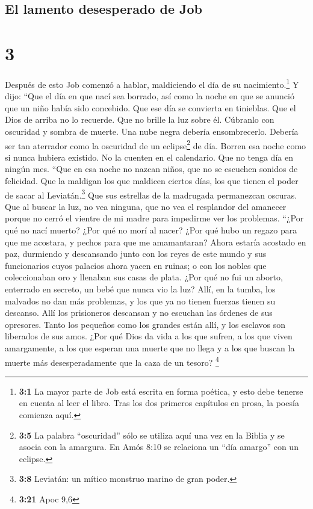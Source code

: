 \hypertarget{el-lamento-desesperado-de-job}{%
\subsection{El lamento desesperado de
Job}\label{el-lamento-desesperado-de-job}}

\hypertarget{section-2}{%
\section{3}\label{section-2}}

 Después de esto Job comenzó a hablar, maldiciendo el día
de su nacimiento.\footnote{\textbf{3:1} La mayor parte de Job está
  escrita en forma poética, y esto debe tenerse en cuenta al leer el
  libro. Tras los dos primeros capítulos en prosa, la poesía comienza
  aquí.}  Y dijo:  ``Que el día en que nací
sea borrado, así como la noche en que se anunció que un niño había sido
concebido.  Que ese día se convierta en tinieblas. Que el
Dios de arriba no lo recuerde. Que no brille la luz sobre él.
 Cúbranlo con oscuridad y sombra de muerte. Una nube negra
debería ensombrecerlo. Debería ser tan aterrador como la oscuridad de un
eclipse\footnote{\textbf{3:5} La palabra ``oscuridad'' sólo se utiliza
  aquí una vez en la Biblia y se asocia con la amargura. En Amós 8:10 se
  relaciona un ``día amargo'' con un eclipse.} de día. 
Borren esa noche como si nunca hubiera existido. No la cuenten en el
calendario. Que no tenga día en ningún mes.  ``Que en esa
noche no nazcan niños, que no se escuchen sonidos de felicidad.
 Que la maldigan los que maldicen ciertos días, los que
tienen el poder de sacar al Leviatán.\footnote{\textbf{3:8} Leviatán: un
  mítico monstruo marino de gran poder.}  Que sus
estrellas de la madrugada permanezcan oscuras. Que al buscar la luz, no
vea ninguna, que no vea el resplandor del amanecer 
porque no cerró el vientre de mi madre para impedirme ver los problemas.
 ``¿Por qué no nací muerto? ¿Por qué no morí al nacer?
 ¿Por qué hubo un regazo para que me acostara, y pechos
para que me amamantaran?  Ahora estaría acostado en paz,
durmiendo y descansando  junto con los reyes de este
mundo y sus funcionarios cuyos palacios ahora yacen en ruinas;
 o con los nobles que coleccionaban oro y llenaban sus
casas de plata.  ¿Por qué no fui un aborto, enterrado en
secreto, un bebé que nunca vio la luz?  Allí, en la
tumba, los malvados no dan más problemas, y los que ya no tienen fuerzas
tienen su descanso.  Allí los prisioneros descansan y no
escuchan las órdenes de sus opresores.  Tanto los
pequeños como los grandes están allí, y los esclavos son liberados de
sus amos.  ¿Por qué Dios da vida a los que sufren, a los
que viven amargamente,  a los que esperan una muerte que
no llega y a los que buscan la muerte más desesperadamente que la caza
de un tesoro? \footnote{\textbf{3:21} Apoc 9,6}

